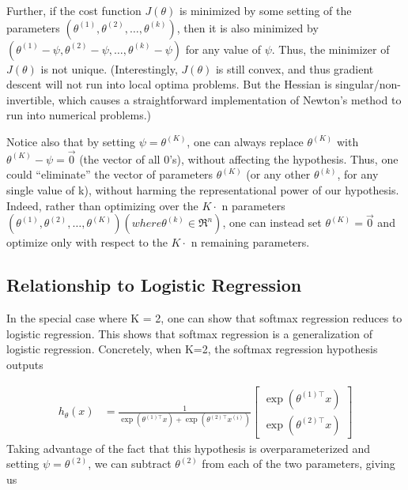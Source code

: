 Further, if the cost function $J(\theta)$ is minimized by some setting of the parameters $(\theta^{(1)}, \theta^{(2)},\ldots, \theta^{(k)})$, then it is also minimized by $(\theta^{(1)} - \psi, \theta^{(2)} - \psi,\ldots, \theta^{(k)} - \psi)$ for any value of $\psi$. Thus, the minimizer of $J(\theta)$ is not unique. (Interestingly, $J(\theta)$ is still convex, and thus gradient descent will not run into local optima problems. But the Hessian is singular/non-invertible, which causes a straightforward implementation of Newton’s method to run into numerical problems.)

Notice also that by setting $\psi = \theta^{(K)}$, one can always replace $\theta^{(K)}$ with $\theta^{(K)} - \psi = \vec{0}$ (the vector of all 0’s), without affecting the hypothesis. Thus, one could “eliminate” the vector of parameters $\theta^{(K)}$ (or any other $\theta^{(k)}$, for any single value of k), without harming the representational power of our hypothesis. Indeed, rather than optimizing over the $K\cdot$ n parameters $(\theta^{(1)}, \theta^{(2)},\ldots, \theta^{(K)}) (where \theta^{(k)} \in \Re^{n})$, one can instead set $\theta^{(K)} = \vec{0}$ and optimize only with respect to the $K \cdot$ n remaining parameters.

\subsection{Relationship to Logistic Regression}

In the special case where K = 2, one can show that softmax regression reduces to logistic regression. This shows that softmax regression is a generalization of logistic regression. Concretely, when K=2, the softmax regression hypothesis outputs

\begin{align} 
	h_\theta(x) &= \frac{1}{ \exp(\theta^{(1)\top}x) + \exp( \theta^{(2)\top} x^{(i)} ) } \begin{bmatrix} \exp( \theta^{(1)\top} x ) \\ \exp( \theta^{(2)\top} x ) \end{bmatrix} 
\end{align}
Taking advantage of the fact that this hypothesis is overparameterized and setting $\psi = \theta^{(2)}$, we can subtract $\theta^{(2)}$ from each of the two parameters, giving us


